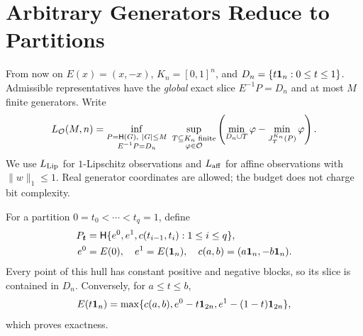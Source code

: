 \section{Arbitrary Generators Reduce to Partitions}\label{sec:partitions}
From now on $E(x)=(x,-x)$, $K_n=[0,1]^n$, and $D_n=\{t\mathbf 1_n:0\le t\le1\}$. Admissible representatives have the \emph{global} exact slice $E^{-1}P=D_n$ and at most $M$ finite generators. Write
\begin{equation}\label{eq:minimax}
L_{\mathcal O}(M,n)=\inf_{\substack{P=\mathsf H(G),\ |G|\le M\\ E^{-1}P=D_n}}
\ \sup_{\substack{T\subseteq K_n\text{ finite}\\\varphi\in\mathcal O}}
\left(\min_{D_n\cup T}\varphi-\min_{J_T^{K_n}(P)}\varphi\right).
\end{equation}
We use $L_{\mathrm{Lip}}$ for $1$-Lipschitz observations and $L_{\mathrm{aff}}$ for affine observations with $\|w\|_1\le1$. Real generator coordinates are allowed; the budget does not charge bit complexity.

For a partition $0=t_0<\cdots<t_q=1$, define
\begin{equation}\label{eq:partition-rep}
\begin{split}
P_{\boldsymbol t}&=\mathsf H\{e^0,e^1,c(t_{i-1},t_i):1\le i\le q\},\\
e^0&=E(0),\quad e^1=E(\mathbf 1_n),\quad c(a,b)=(a\mathbf 1_n,-b\mathbf 1_n).
\end{split}
\end{equation}
Every point of this hull has constant positive and negative blocks, so its slice is contained in $D_n$. Conversely, for $a\le t\le b$,
\[
E(t\mathbf 1_n)=\max\{c(a,b),e^0-t\mathbf 1_{2n},e^1-(1-t)\mathbf 1_{2n}\},
\]
which proves exactness.

